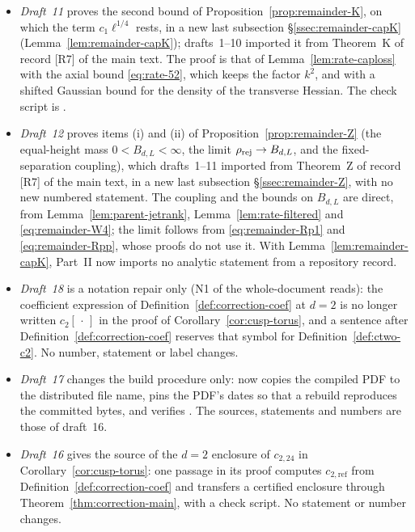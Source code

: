 \begin{itemize}[leftmargin=1.5em,itemsep=2pt]
\begin{itemize}[leftmargin=1.2em,itemsep=1pt]
  \item No statement number or display number of draft~9 changes. Three check scripts are shipped: ,  and .
  \end{itemize}
\item \emph{Draft~11} proves the second bound of Proposition~\ref{prop:remainder-K}, on which the term $c_1\ell^{1/4}$ rests, in a new last subsection \S\ref{ssec:remainder-capK} (Lemma~\ref{lem:remainder-capK}); drafts~1--10 imported it from Theorem~K of record [R7] of the main text. The proof is that of Lemma~\ref{lem:rate-caploss} with the axial bound \eqref{eq:rate-52}, which keeps the factor $k^2$, and with a shifted Gaussian bound for the density of the transverse Hessian. The check script is .
\item \emph{Draft~12} proves items (i) and (ii) of Proposition~\ref{prop:remainder-Z} (the equal-height mass $0<B_{d,L}<\infty$, the limit $\rho_{\mathrm{rej}}\to B_{d,L}$, and the fixed-separation coupling), which drafts~1--11 imported from Theorem~Z of record [R7] of the main text, in a new last subsection \S\ref{ssec:remainder-Z}, with no new numbered statement. The coupling and the bounds on $B_{d,L}$ are direct, from Lemma~\ref{lem:parent-jetrank}, Lemma~\ref{lem:rate-filtered} and \eqref{eq:remainder-W4}; the limit follows from \eqref{eq:remainder-Rp1} and \eqref{eq:remainder-Rpp}, whose proofs do not use it. With Lemma~\ref{lem:remainder-capK}, Part~II now imports no analytic statement from a repository record.
\item \emph{Draft~18} is a notation repair only (N1 of the whole-document reads): the coefficient expression of Definition~\ref{def:correction-coef} at $d=2$ is no longer written $c_2[\,\cdot\,]$ in the proof of Corollary~\ref{cor:cusp-torus}, and a sentence after Definition~\ref{def:correction-coef} reserves that symbol for Definition~\ref{def:ctwo-c2}. No number, statement or label changes.
\item \emph{Draft~17} changes the build procedure only:  now copies the compiled PDF to the distributed file name, pins the PDF's dates so that a rebuild reproduces the committed bytes, and verifies . The sources, statements and numbers are those of draft~16.
\item \emph{Draft~16} gives the source of the $d=2$ enclosure of $c_{2,24}$ in Corollary~\ref{cor:cusp-torus}: one passage in its proof computes $c_{2,\mathrm{ref}}$ from Definition~\ref{def:correction-coef} and transfers a certified enclosure through Theorem~\ref{thm:correction-main}, with a check script. No statement or number changes.

\end{itemize}
